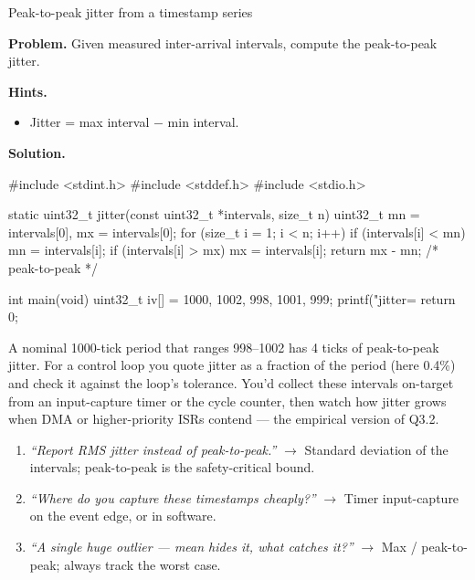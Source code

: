 \begin{gymproblem}{Peak-to-peak jitter from a timestamp series}

\textbf{Problem.} Given measured inter-arrival intervals, compute the
peak-to-peak jitter.

\textbf{Hints.}
\begin{itemize}
\item Jitter = max interval $-$ min interval.
\end{itemize}

\attempt

\textbf{Solution.}
\begin{cgym}
#include <stdint.h>
#include <stddef.h>
#include <stdio.h>

static uint32_t jitter(const uint32_t *intervals, size_t n) {
    uint32_t mn = intervals[0], mx = intervals[0];
    for (size_t i = 1; i < n; i++) {
        if (intervals[i] < mn) mn = intervals[i];
        if (intervals[i] > mx) mx = intervals[i];
    }
    return mx - mn;     /* peak-to-peak */
}

int main(void) {
    uint32_t iv[] = {1000, 1002, 998, 1001, 999};
    printf("jitter=%
    return 0;
}
\end{cgym}

A nominal 1000-tick period that ranges 998--1002 has 4 ticks of peak-to-peak
jitter. For a control loop you quote jitter as a fraction of the period (here
0.4\%) and check it against the loop's tolerance. You'd collect these intervals
on-target from an input-capture timer or the cycle counter, then watch how
jitter grows when DMA or higher-priority ISRs contend --- the empirical version
of Q3.2.

\followups
\begin{enumerate}
\item \emph{``Report RMS jitter instead of peak-to-peak.''} $\rightarrow$
  Standard deviation of the intervals; peak-to-peak is the safety-critical
  bound.
\item \emph{``Where do you capture these timestamps cheaply?''} $\rightarrow$
  Timer input-capture on the event edge, or  in software.
\item \emph{``A single huge outlier --- mean hides it, what catches it?''}
  $\rightarrow$ Max / peak-to-peak; always track the worst case.
\end{enumerate}
\end{gymproblem}

